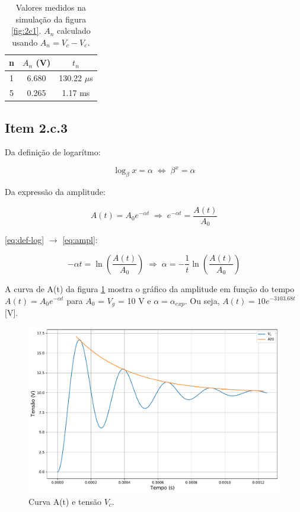 \documentclass[11pt]{article}
\begin{document}
\begin{table}[h!]
  \centering
  \begin{tabular}{|c|c|c|}
    \hline
    n & $A_{n}$ (V) & $t_{n}$        \\
    \hline
    1 & 6.680       & 130.22  $\mu$s \\
    5 & 0.265       & 1.17  ms       \\
    \hline
  \end{tabular}
  \caption{Valores medidos na simulação da figura \ref{fig:2c1}. $A_{n}$ calculado usando $A_{n} = V_{c} - V_{e}$.}
  \label{tab:2c2}
\end{table}

\subsection*{Item 2.c.3}

Da definição de logarítmo:

\begin{equation}
  \log_\beta x = \alpha \; \Leftrightarrow \; \beta^x = \alpha
  \label{eq:def-log}
\end{equation}

Da expressão da amplitude:

\begin{equation}
  A(t) {}={} A_0 e^{-\alpha t} \; \Rightarrow \; e^{-\alpha t} {}={} \frac{A(t)}{A_0}
  \label{eq:ampl}
\end{equation}

\eqref{eq:def-log} $\rightarrow$ \eqref{eq:ampl}:

$$
  -\alpha t = \ln \left(\frac{A(t)}{A_0}\right) \; \Rightarrow \; \alpha = - \frac{1}{t} \ln \left(\frac{A(t)}{A_0}\right)
$$

A curva de A(t) da figura \ref{fig:2c3} mostra o gráfico da amplitude em função do tempo $A(t) = A_0 e^{-\alpha t}$ para $A_0$ = $V_g$ = 10 V e $\alpha = \alpha_{exp}$. Ou seja, $A(t) = 10 e^{-3103.68 t}$ [V].

\pagebreak

\begin{figure}[h!]
  \centering
  \includegraphics[width=\textwidth]{fig/2c3}
  \caption{Curva A(t) e tensão $V_c$.}
  \label{fig:2c3}
\end{figure}
\end{document}
